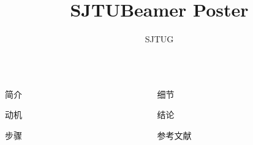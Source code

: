 \documentclass{ctexbeamer}
\begin{document}
\title{SJTUBeamer Poster}
\author{SJTUG}
\logo{\zhlogo}
\begin{frame}[fragile]
  \begin{columns}[T]
    \begin{column}{.45\textwidth}
      \begin{stampblock}{简介}
        \zhlipsum[1]
      \end{stampblock}

      \begin{stampblock}{动机}
        \zhlipsum[2]
      \end{stampblock}

      \begin{stampblock}{步骤}
        \zhlipsum[3]
      \end{stampblock}
    \end{column}
    \begin{column}{.45\textwidth}
      \begin{stampblock}{细节}
        \zhlipsum[4]
      \end{stampblock}

      \begin{stampblock}{结论}
        \zhlipsum[5]
      \end{stampblock}

      \begin{stampblock}{参考文献}
        \zhlipsum[6]
      \end{stampblock}
    \end{column}
  \end{columns}
\end{frame}
\end{document}
